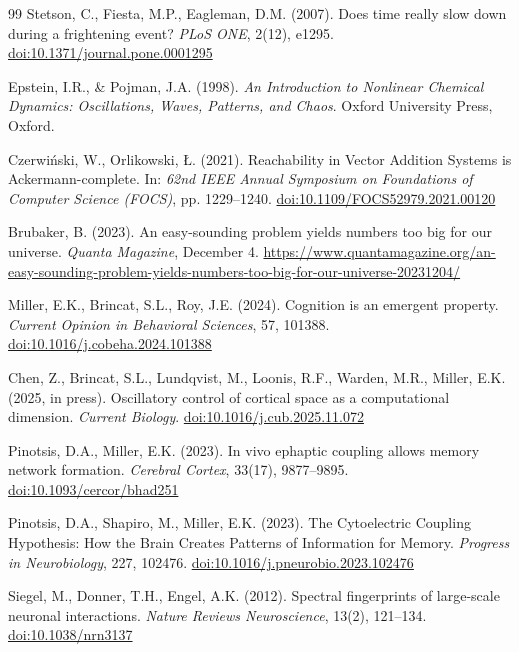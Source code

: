 \documentclass[12pt]{article}
\begin{document}
\begin{thebibliography}{99}
Stetson, C., Fiesta, M.P., Eagleman, D.M. (2007). Does time really slow down during a frightening event? \textit{PLoS ONE}, 2(12), e1295. \href{https://doi.org/10.1371/journal.pone.0001295}{doi:10.1371/journal.pone.0001295}

Epstein, I.R., \& Pojman, J.A. (1998). \textit{An Introduction to Nonlinear Chemical Dynamics: Oscillations, Waves, Patterns, and Chaos}. Oxford University Press, Oxford.

Czerwiński, W., Orlikowski, Ł. (2021). Reachability in Vector Addition Systems is Ackermann-complete. In: \textit{62nd IEEE Annual Symposium on Foundations of Computer Science (FOCS)}, pp. 1229--1240. \href{https://doi.org/10.1109/FOCS52979.2021.00120}{doi:10.1109/FOCS52979.2021.00120}

Brubaker, B. (2023). An easy-sounding problem yields numbers too big for our universe. \textit{Quanta Magazine}, December 4. \href{https://www.quantamagazine.org/an-easy-sounding-problem-yields-numbers-too-big-for-our-universe-20231204/}{https://www.quantamagazine.org/an-easy-sounding-problem-yields-numbers-too-big-for-our-universe-20231204/}

Miller, E.K., Brincat, S.L., Roy, J.E. (2024). Cognition is an emergent property. \textit{Current Opinion in Behavioral Sciences}, 57, 101388. \href{https://doi.org/10.1016/j.cobeha.2024.101388}{doi:10.1016/j.cobeha.2024.101388}

Chen, Z., Brincat, S.L., Lundqvist, M., Loonis, R.F., Warden, M.R., Miller, E.K. (2025, in press). Oscillatory control of cortical space as a computational dimension. \textit{Current Biology}. \href{https://doi.org/10.1016/j.cub.2025.11.072}{doi:10.1016/j.cub.2025.11.072}

Pinotsis, D.A., Miller, E.K. (2023). In vivo ephaptic coupling allows memory network formation. \textit{Cerebral Cortex}, 33(17), 9877--9895. \href{https://doi.org/10.1093/cercor/bhad251}{doi:10.1093/cercor/bhad251}

Pinotsis, D.A., Shapiro, M., Miller, E.K. (2023). The Cytoelectric Coupling Hypothesis: How the Brain Creates Patterns of Information for Memory. \textit{Progress in Neurobiology}, 227, 102476. \href{https://doi.org/10.1016/j.pneurobio.2023.102476}{doi:10.1016/j.pneurobio.2023.102476}

Siegel, M., Donner, T.H., Engel, A.K. (2012). Spectral fingerprints of large-scale neuronal interactions. \textit{Nature Reviews Neuroscience}, 13(2), 121--134. \href{https://doi.org/10.1038/nrn3137}{doi:10.1038/nrn3137}


\end{thebibliography}
\end{document}
